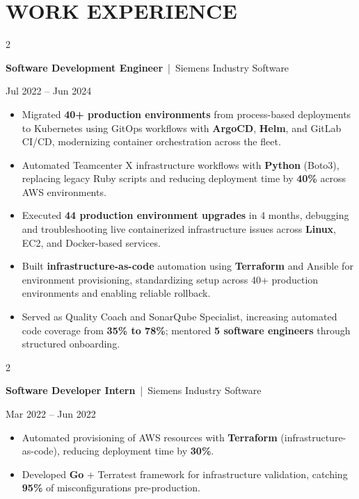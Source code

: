 \documentclass[10pt, letterpaper]{article}
\newenvironment{highlights}{
    \begin{itemize}[
        topsep=0.10 cm,
        parsep=0.06 cm,
        partopsep=0pt,
        itemsep=0.06 cm,
        leftmargin=12pt
    ]
}{
    \end{itemize}
}
\newenvironment{twocolentry}[2][]{
    \onecolentry
    \def\secondColumn{#2}
    \setcolumnwidth{\fill, 4.5 cm}
    \begin{paracol}{2}
}{
    \switchcolumn \raggedleft \secondColumn
    \end{paracol}
    \endonecolentry
}
\begin{document}
\section{WORK EXPERIENCE}
\begin{twocolentry}{Jul 2022 -- Jun 2024}
\textbf{Software Development Engineer} \,|\, Siemens Industry Software
\end{twocolentry}
\begin{highlights}
  \item Migrated \textbf{40+ production environments} from process-based deployments to Kubernetes using GitOps workflows with \textbf{ArgoCD}, \textbf{Helm}, and GitLab CI/CD, modernizing container orchestration across the fleet.
  \item Automated Teamcenter X infrastructure workflows with \textbf{Python} (Boto3), replacing legacy Ruby scripts and reducing deployment time by \textbf{40\%} across AWS environments.
  \item Executed \textbf{44 production environment upgrades} in 4 months, debugging and troubleshooting live containerized infrastructure issues across \textbf{Linux}, EC2, and Docker-based services.
  \item Built \textbf{infrastructure-as-code} automation using \textbf{Terraform} and Ansible for environment provisioning, standardizing setup across 40+ production environments and enabling reliable rollback.
  \item Served as Quality Coach and SonarQube Specialist, increasing automated code coverage from \textbf{35\% to 78\%}; mentored \textbf{5 software engineers} through structured onboarding.
\end{highlights}

\vspace{0.15 cm}

\begin{twocolentry}{Mar 2022 -- Jun 2022}
\textbf{Software Developer Intern} \,|\, Siemens Industry Software
\end{twocolentry}
\begin{highlights}
  \item Automated provisioning of AWS resources with \textbf{Terraform} (infrastructure-as-code), reducing deployment time by \textbf{30\%}.
  \item Developed \textbf{Go} + Terratest framework for infrastructure validation, catching \textbf{95\%} of misconfigurations pre-production.
\end{highlights}
\end{document}
